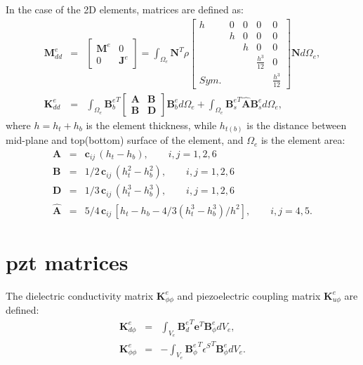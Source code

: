 In the case of the 2D elements, matrices are defined as:
\begin{eqnarray}
	\textbf{M}_{dd}^e & = &
	\left [
	\begin{array}{cc}
		\textbf{M}^e & 0\\
		0 & \textbf{J}^e
	\end{array}
	\right] =
	\int_{\Omega_e}\textbf{N}^T\rho
	\left [
	\begin{array}{ccccc}
		h & 0 & 0 & 0 & 0 \\
		& h & 0 & 0 & 0 \\
		&  & h & 0 & 0\\
		&  &  & \frac{h^3}{12} & 0\\
		Sym. &  &  &  & \frac{h^3}{12}
	\end{array} \right]
	\textbf{N} d\Omega_e,\\
	\textbf{K}_{dd}^e & = & \int_{\Omega_e}{\textbf{B}_b^e}^T
	\left[
	\begin{array}{cc}
		\textbf{A} & \textbf{B}\\
		\textbf{B} & \textbf{D}
	\end{array} \right]
	\textbf{B}_b^ed \Omega_e+\int_{\Omega_e}{\textbf{B}_s^e}^T\hat{\textbf{A}}\textbf{B}_s^ed \Omega_e,
\end{eqnarray}
where \(h=h_t+h_b\) is the element thickness, while \(h_{t(b)}\) is the distance between mid-plane and top(bottom) surface of the element, and \(\Omega_e\) is the element area:
\begin{eqnarray}
	\textbf{A} & = & \textbf{c}_{ij}\,(h_t-h_b),\qquad i,j=1,2,6\nonumber\\
	\textbf{B} & = & 1/2\, \textbf{c}_{ij}\,(h_t^2-h_b^2),\qquad i,j=1,2,6\nonumber\\
	\textbf{D} & = & 1/3\, \textbf{c}_{ij}\,(h_t^3-h_b^3),\qquad i,j=1,2,6\nonumber\\
	\hat{\textbf{A}} & = & 5/4\, \textbf{c}_{ij}\,\left[h_t-h_b-4/3\left(h_t^3-h_b^3\right)/h^2\right],\qquad i,j=4,5.
\end{eqnarray}
\section{\ac{pzt} matrices}

The dielectric conductivity matrix \(\textbf{K}_{\phi \phi}^e\) and piezoelectric coupling matrix \(\textbf{K}_{u \phi}^e\) are defined:
\begin{eqnarray}
	\textbf{K}_{d\phi}^e & = & \int_{V_e}{\textbf{B}_d^e}^T\textbf{e}^T \textbf{B}_{\phi}^ed V_e,\\
	\textbf{K}_{\phi \phi}^e & = & -\int_{V_e}{\textbf{B}_{\phi}^e}^T 
	{\textbf{\(\epsilon\)}^S}^T \textbf{B}_{\phi}^edV_e.
\end{eqnarray}
